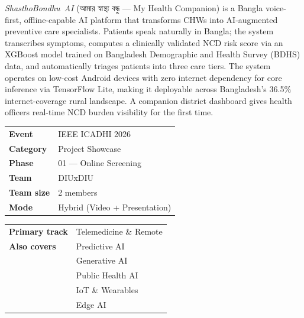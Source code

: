 \documentclass[12pt, a4paper]{article}
\newcommand{\sba}{\textit{ShasthoBondhu~AI}}
\newcommand{\bn}[1]{{\bengalifont #1}}
\begin{document}
\begin{titlepage}
\begin{tcolorbox}
\medskip
\sba{} (\bn{আমার স্বাস্থ্য বন্ধু} — My Health Companion) is a Bangla
voice-first, offline-capable AI platform that transforms CHWs into AI-augmented
preventive care specialists. Patients speak naturally in Bangla; the system
transcribes symptoms, computes a clinically validated NCD risk score via an
XGBoost model trained on Bangladesh Demographic and Health Survey (BDHS) data,
and automatically triages patients into three care tiers. The system operates on
low-cost Android devices with zero internet dependency for core inference via
TensorFlow Lite, making it deployable across Bangladesh's 36.5\% internet-coverage
rural landscape. A companion district dashboard gives health officers real-time
NCD burden visibility for the first time.
\end{tcolorbox}

\vspace{18pt}

\noindent
\begin{minipage}[t]{0.47\linewidth}
\begin{tcolorbox}[
  enhanced, arc=4pt, boxrule=0.7pt,
  colback=gray10, colframe=gray30,
  top=8pt, bottom=8pt, left=12pt, right=12pt
]
\small
\begin{tabular}{@{}ll@{}}
\textcolor{gray60}{\textbf{Event}}       & IEEE ICADHI 2026 \\[3pt]
\textcolor{gray60}{\textbf{Category}}    & Project Showcase \\[3pt]
\textcolor{gray60}{\textbf{Phase}}       & 01 — Online Screening \\[3pt]
\textcolor{gray60}{\textbf{Team}}        & DIUxDIU \\[3pt]
\textcolor{gray60}{\textbf{Team size}}   & 2 members \\[3pt]
\textcolor{gray60}{\textbf{Mode}}        & Hybrid (Video + Presentation)
\end{tabular}
\end{tcolorbox}
\end{minipage}
\hfill
\begin{minipage}[t]{0.47\linewidth}
\begin{tcolorbox}[
  enhanced, arc=4pt, boxrule=0.7pt,
  colback=gray10, colframe=gray30,
  top=8pt, bottom=8pt, left=12pt, right=12pt
]
\small
\begin{tabular}{@{}ll@{}}
\textcolor{gray60}{\textbf{Primary track}}  & Telemedicine \& Remote \\[3pt]
\textcolor{gray60}{\textbf{Also covers}}    & Predictive AI \\[3pt]
                                             & Generative AI \\[3pt]
                                             & Public Health AI \\[3pt]
                                             & IoT \& Wearables \\[3pt]
                                             & Edge AI \\
\end{tabular}
\end{tcolorbox}
\end{minipage}


\end{titlepage}
\end{document}
